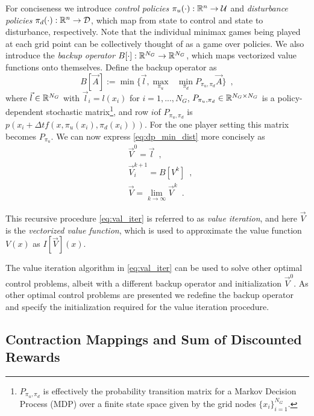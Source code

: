 For conciseness we introduce \emph{control policies} ${\pi_u(\cdot): \mathbb{R}^n \rightarrow \mathcal{U}}$ and \emph{disturbance policies} ${\pi_d(\cdot): \mathbb{R}^n \rightarrow \mathcal{D}}$, which map from state to control and state to disturbance, respectively. Note that the individual minimax games being played at each grid point can be collectively thought of as a game over policies. We also introduce the \emph{backup operator} ${B[\cdot]: \mathbb{R}^{N_G} \rightarrow \mathbb{R}^{N_G}}$, which maps vectorized value functions onto themselves. Define the backup operator as
%
\begin{equation} \label{eq: op_min_dist}
 B[\vec{A}] := \min\{\vec{l},  \underset{\pi_u}{\max}\text{ }\underset{ \pi_d}{\min} P_{\pi_u, \pi_d} \vec{A}\} \enspace,
\end{equation}%
\noindent where ${\vec{l} \in \mathbb{R}^{N_G}}$ with ${\vec{l}_i = l(x_i)}$ for ${i=1, ..., N_G}$, ${P_{\pi_u, \pi_d} \in \mathbb{R}^{N_G \times N_G}}$ is a policy-dependent stochastic matrix\footnote{$P_{\pi_u, \pi_d}$ is effectively the probability transition matrix for a Markov Decision Process (MDP) over a finite state space given by the grid nodes ${\{x_i\}_{i=1}^{N_G}}$.}, and row $i$of $P_{\pi_u, \pi_d}$ is $p(x_i+\Delta tf(x, \pi_u(x_i), \pi_d(x_i)))$. For the one player setting this matrix becomes $P_{\pi_u}$. We can now express \eqref{eq:dp_min_dist} more concisely as
%
\begin{subequations}\label{eq:val_iter}
\begin{align}
&\vec{V}^{0} = \vec{l} \enspace,\\
&\vec{V}_{i}^{k+1} = B[V^k] \enspace,\\
&\vec{V} = \lim_{k\rightarrow \infty} \vec{V}^{k} \enspace.
\end{align}
\end{subequations}

This recursive procedure \eqref{eq:val_iter} is referred to as \emph{value iteration}, and here $\vec{V}$ is the \emph{vectorized value function}, which is used to approximate the value function $V(x)$ as $I[\vec{V}](x)$. 

The value iteration algorithm in \eqref{eq:val_iter} can be used to solve other optimal control problems, albeit with a different backup operator and initialization $\vec{V}^{0}$. As other optimal control problems are presented we redefine the backup operator and specify the initialization required for the value iteration procedure.

\subsection{Contraction Mappings and Sum of Discounted Rewards}

